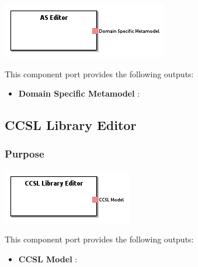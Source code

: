 \documentclass{gemoc} %
\begin{document}

\begin{center}
\includegraphics*[trim=0.0cm 0.0cm 0cm 0.0cm, clip=true]{../images/generated/Generated_AS_Editor.png}
\end{center}


This component port provides the following outputs:
\begin{itemize}
  \item \textbf{Domain Specific Metamodel} :
\end{itemize}


\subsection{CCSL Library Editor}


\subsubsection{Purpose}


\begin{center}
\includegraphics*[trim=0.0cm 0.0cm 0cm 0.0cm, clip=true]{../images/generated/Generated_CCSL_Library_Editor.png}
\end{center}


This component port provides the following outputs:
\begin{itemize}
  \item \textbf{CCSL Model} :
\end{itemize}
\end{document}
